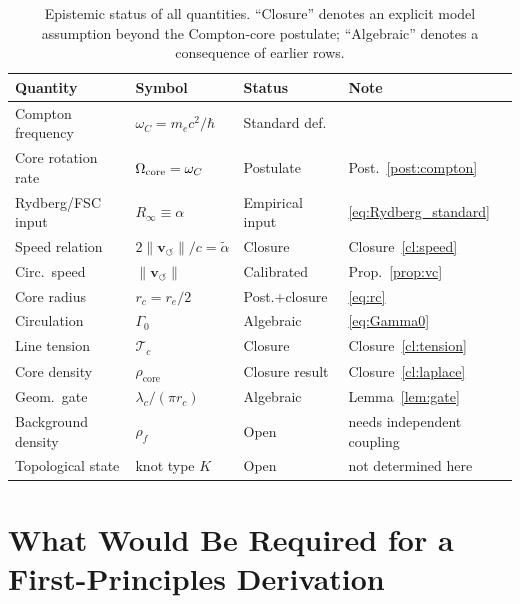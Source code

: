 \documentclass[aps,pra,preprint,longbibliography,nofootinbib]{revtex4-2}
\newcommand{\vnorm}{\lVert\mathbf{v}_{\!\boldsymbol{\circlearrowleft}}\rVert} %
\newcommand{\rhof}{\rho_{\!f}}                   %
\newcommand{\rhocore}{\rho_{\mathrm{core}}}      %
\newcommand{\rc}{r_c}                            %
\newcommand{\omC}{\omega_C}                      %
\newcommand{\lc}{\lambda_c}                      %
\newcommand{\Rinf}{R_\infty}                     %
\newcommand{\Tc}{\mathcal{T}_c}                  %
\newcommand{\Gz}{\Gamma_0}                       %
\begin{document}
\begin{table}[h]
\centering
\caption{Epistemic status of all quantities.  ``Closure'' denotes an
explicit model assumption beyond the Compton-core postulate; ``Algebraic''
denotes a consequence of earlier rows.}
\label{tab:status}
\begin{tabular}{llll}
\toprule
Quantity & Symbol & Status & Note \\
\midrule
Compton frequency  & $\omC = m_e c^2/\hbar$     & Standard def.  & \cite{MohrTaylor2022} \\
Core rotation rate & $\Omega_{\rm core}=\omC$   & Postulate       & Post.~\ref{post:compton} \\
Rydberg/FSC input  & $\Rinf\equiv\alpha$        & Empirical input & \eqref{eq:Rydberg_standard} \\
Speed relation     & $2\vnorm/c=\tilde\alpha$   & Closure         & Closure~\ref{cl:speed} \\
Circ.\ speed       & $\vnorm$                   & Calibrated      & Prop.~\ref{prop:vc} \\
Core radius        & $\rc = r_e/2$              & Post.+closure   & \eqref{eq:rc} \\
Circulation        & $\Gz$                      & Algebraic       & \eqref{eq:Gamma0} \\
Line tension       & $\Tc$                      & Closure         & Closure~\ref{cl:tension} \\
Core density       & $\rhocore$                 & Closure result  & Closure~\ref{cl:laplace} \\
Geom.\ gate        & $\lc/(\pi\rc)$             & Algebraic       & Lemma~\ref{lem:gate} \\
Background density & $\rhof$                    & Open            & needs independent coupling \\
Topological state  & knot type $K$              & Open            & not determined here \\
\bottomrule
\end{tabular}
\end{table}

\section{What Would Be Required for a First-Principles Derivation}
\label{sec:requirements}
\end{document}
